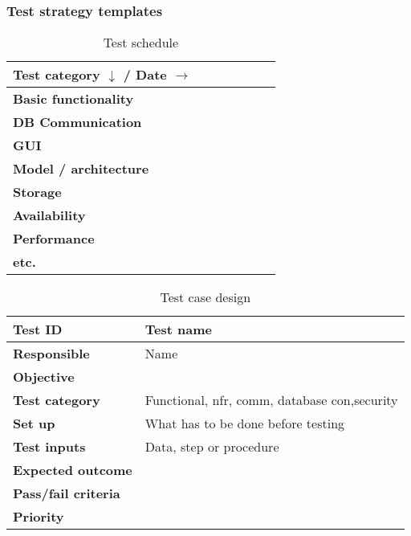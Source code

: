 \subsubsection{Test strategy templates}
\begin{table}[htb]
	\centering
    \begin{tabular}{| l | l | l | l | l | l | l |}
		\hline
		\textbf{Test category \(\downarrow\) / Date \(\rightarrow\)} & & & & & & \\ \hline
		\textbf{Basic functionality} & & & & & & \\ \hline
		\textbf{DB Communication} & & & & & & \\ \hline
		\textbf{GUI} & & & & & & \\ \hline
		\textbf{Model / architecture} & & & & & & \\ \hline
		\textbf{Storage} & & & & & & \\ \hline
		\textbf{Availability} & & & & & & \\ \hline
		\textbf{Performance} & & & & & & \\ \hline
		\textbf{etc.} & & & & & & \\ \hline
    \end{tabular}
  \caption{Test schedule}
\end{table}

\begin{table}[htb]
	\centering
    \begin{tabular}{| l | l |}
		\hline
		\textbf{Test ID} & Test name \\ \hline
		\textbf{Responsible} & Name \\ \hline
		\textbf{Objective} &  \\ \hline
		\textbf{Test category} & Functional, nfr, comm, database con,security \\ \hline
		\textbf{Set up} & What has to be done before testing \\ \hline
		\textbf{Test inputs} & Data, step or procedure \\ \hline
		\textbf{Expected outcome} & \\ \hline
		\textbf{Pass/fail criteria} & \\ \hline
		\textbf{Priority} & \\ \hline
    \end{tabular}
  \caption{Test case design}
\end{table}

